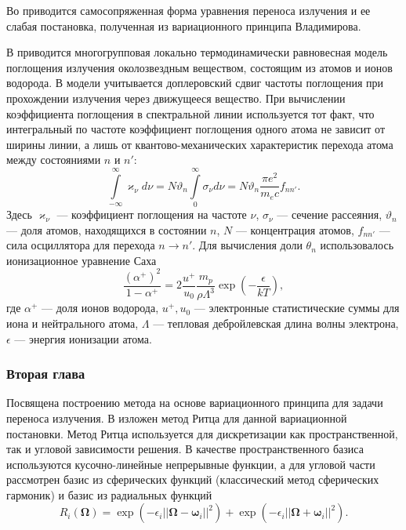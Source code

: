 Во  приводится самосопряженная форма уравнения переноса излучения и ее слабая постановка, полученная из вариационного принципа Владимирова. 

В  приводится многогрупповая локально термодинамически равновесная модель поглощения излучения околозвездным веществом, состоящим из атомов и ионов водорода. В модели учитывается доплеровский сдвиг частоты поглощения при прохождении излучения через движущееся вещество. При вычислении коэффициента поглощения в спектральной линии используется тот факт, что интегральный по частоте коэффициент поглощения одного атома не зависит от ширины линии, а лишь от квантово-механических характеристик перехода атома между состояниями $n$ и $n'$:
\[
\int\limits_{-\infty}^\infty \varkappa_\nu d\nu = N \vartheta_n \int\limits_0^\infty \sigma_\nu d\nu = N \vartheta_n \frac{\pi e^2}{m_e c} f_{nn'}.
\]
Здесь $\varkappa_\nu$ --- коэффициент поглощения на частоте $\nu$, $\sigma_\nu$ --- сечение рассеяния, $\vartheta_n$ --- доля атомов, находящихся в состоянии $n$, $N$ --- концентрация атомов, $f_{nn'}$ --- сила осциллятора для перехода $n \to n'$. Для вычисления доли $\theta_n$ использовалось ионизационное уравнение Саха
\[
\frac{(\alpha^+)^2}{1 - \alpha^+} = 2 \frac{u^+}{u_0} \frac{m_p }{\rho\Lambda^3} \exp\left(-\frac{\epsilon}{kT}\right),
\]
где $\alpha^+$ --- доля ионов водорода, $u^+, u_0$ --- электронные статистические суммы для иона и нейтрального атома, $\Lambda$ --- тепловая дебройлевская длина волны электрона, $\epsilon$ --- энергия ионизации атома.


\subsubsection*{Вторая глава}
Посвящена построению метода на основе вариационного принципа для задачи переноса излучения. В  изложен метод Ритца для данной вариационной постановки. Метод Ритца используется для дискретизации как пространственной, так и угловой зависимости решения. В качестве пространственного базиса используются кусочно-линейные непрерывные функции, а для угловой части рассмотрен базис из сферических функций (классический метод сферических гармоник) и базис из радиальных функций
\[
R_i(\boldsymbol \Omega) = \exp (-\epsilon_i ||\boldsymbol \Omega - \boldsymbol \omega_i||^2) + \exp (-\epsilon_i ||\boldsymbol \Omega + \boldsymbol \omega_i||^2).
\]

